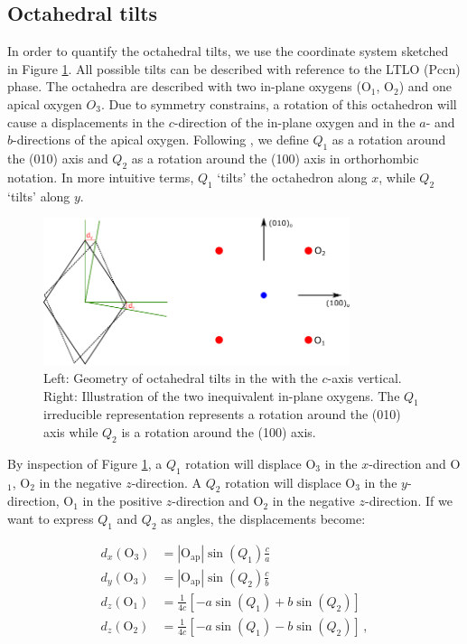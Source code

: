 \subsection{Octahedral tilts}
In order to quantify the octahedral tilts, we use the coordinate system sketched in Figure \ref{fig:tilt}. All possible tilts can be described with reference to the LTLO (Pccn) phase. The octahedra are described with two in-plane oxygens (O$_1$, O$_2$) and one apical oxygen $O_3$. Due to symmetry constrains, a rotation of this octahedron will cause a displacements in the $c$-direction of the in-plane oxygen and in the $a$- and $b$-directions of the apical oxygen. Following \cite{Axe1989}, we define $Q_1$ as a rotation around the (010) axis and $Q_2$ as a rotation around the (100) axis in orthorhombic notation. In more intuitive terms, $Q_1$ `tilts' the octahedron along $x$, while $Q_2$ `tilts' along $y$.

\begin{figure}
	\centering
	\includegraphics[width=0.8\textwidth]{fig/simulation/tilt.pdf}
	\caption[Geometry of octahedral tilts]{Left: Geometry of octahedral tilts in the with the $c$-axis vertical. Right: Illustration of the two inequivalent in-plane oxygens. The $Q_1$ irreducible representation represents a rotation around the (010) axis while $Q_2$ is a rotation around the (100) axis.}
	\label{fig:tilt}
\end{figure}

By inspection of Figure \ref{fig:tilt}, a $Q_1$ rotation will displace O$_3$ in the $x$-direction and O$_1$, O$_2$ in the negative $z$-direction. A $Q_2$ rotation will displace O$_3$ in the $y$-direction, O$_1$ in the positive $z$-direction and O$_2$ in the negative $z$-direction. If we want to express $Q_1$ and $Q_2$ as angles, the displacements become:


\begin{align*}
d_x(\text{O}_3) &= | \text{O}_\text{ap} | \sin (Q_1) \frac{c}{a} \\
d_y(\text{O}_3) &= | \text{O}_\text{ap} | \sin (Q_2) \frac{c}{b} \\
d_z(\text{O}_1) &= \frac{1}{4c} \left[ - a \sin (Q_1) + b \sin (Q_2) \right] \\
d_z(\text{O}_2) &= \frac{1}{4c} \left[ - a \sin (Q_1) - b \sin (Q_2) \right] \, ,
\end{align*}

